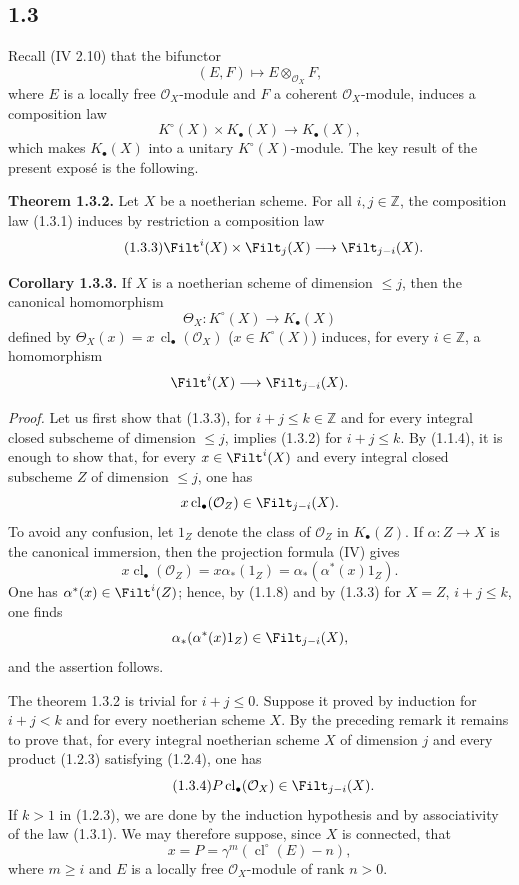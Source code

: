 \documentclass[11pt]{article}
\newcommand{\cl}{\operatorname{cl}}
\begin{document}
\subsection*{1.3}
Recall (IV 2.10) that the bifunctor
\[
 (E,F)\longmapsto E\otimes_{\mathcal O_X}F,
\]
where $E$ is a locally free $\mathcal O_X$-module and $F$ a coherent $\mathcal O_X$-module, induces a composition law
\begin{equation}\tag{1.3.1}
 K^\circ(X)\times K_\bullet(X)\longrightarrow K_\bullet(X),
\end{equation}
which makes $K_\bullet(X)$ into a unitary $K^\circ(X)$-module. The key result of the present exposé is the following.

\textbf{Theorem 1.3.2.} Let $X$ be a noetherian scheme. For all $i,j\in\mathbb Z$, the composition law (1.3.1) induces by restriction a composition law
\begin{equation}\tag{1.3.3}
 \Filt^i(X)\times\Filt_j(X)\longrightarrow\Filt_{j-i}(X).
\end{equation}

\textbf{Corollary 1.3.3.} If $X$ is a noetherian scheme of dimension $\leq j$, then the canonical homomorphism
\[
 \Theta_X:K^\circ(X)\longrightarrow K_\bullet(X)
\]
defined by $\Theta_X(x)=x\,\cl_\bullet(\mathcal O_X)$ ($x\in K^\circ(X)$) induces, for every $i\in\mathbb Z$, a homomorphism
\[
 \Filt^i(X)\longrightarrow \Filt_{j-i}(X).
\]

\emph{Proof.} Let us first show that (1.3.3), for $i+j\leq k\in\mathbb Z$ and for every integral closed subscheme of dimension $\leq j$, implies (1.3.2) for $i+j\leq k$. By (1.1.4), it is enough to show that, for every $x\in\Filt^i(X)$ and every integral closed subscheme $Z$ of dimension $\leq j$, one has
\[
 x\cl_\bullet(\mathcal O_Z)\in\Filt_{j-i}(X).
\]
To avoid any confusion, let $1_Z$ denote the class of $\mathcal O_Z$ in $K_\bullet(Z)$. If $\alpha:Z\to X$ is the canonical immersion, then the projection formula (IV) gives
\[
 x\cl_\bullet(\mathcal O_Z)=x\alpha_*(1_Z)=\alpha_*(\alpha^*(x)1_Z).
\]
One has $\alpha^*(x)\in\Filt^i(Z)$; hence, by (1.1.8) and by (1.3.3) for $X=Z$, $i+j\leq k$, one finds
\[
 \alpha_*(\alpha^*(x)1_Z)\in\Filt_{j-i}(X),
\]
and the assertion follows.

The theorem 1.3.2 is trivial for $i+j\leq0$. Suppose it proved by induction for $i+j<k$ and for every noetherian scheme $X$. By the preceding remark it remains to prove that, for every integral noetherian scheme $X$ of dimension $j$ and every product (1.2.3) satisfying (1.2.4), one has
\begin{equation}\tag{1.3.4}
 P\cl_\bullet(\mathcal O_X)\in\Filt_{j-i}(X).
\end{equation}
If $k>1$ in (1.2.3), we are done by the induction hypothesis and by associativity of the law (1.3.1). We may therefore suppose, since $X$ is connected, that
\begin{equation}\tag{1.3.5}
 x=P=\gamma^m(\cl^\circ(E)-n),
\end{equation}
where $m\geq i$ and $E$ is a locally free $\mathcal O_X$-module of rank $n>0$.
\end{document}
